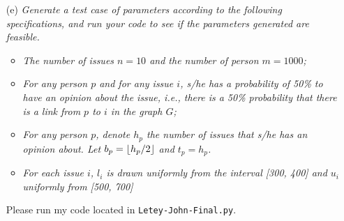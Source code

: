 \documentclass[12pt]{article}
\DeclarePairedDelimiter\floor{\lfloor}{\rfloor}
\begin{document}
{\begin{enumerate}
As Rhonda said, I called the built in NetworkX function.
\item[(e)]\textsl{Generate a test case of parameters according to the following specifications, and run your code to see if the parameters generated are feasible.}
\begin{itemize}
  \item \textsl{The number of issues $n = 10$ and the number of person $m = 1000$;}
  \item \textsl{For any person $p$ and for any issue $i$, s/he has a probability of 50\% to have an opinion about the issue, i.e., there is a 50\% probability that there is a link from $p$ to $i$ in the graph $G$;}
  \item \textsl{For any person $p$, denote $h_p$ the number of issues that s/he has an opinion about. Let $b_p = \floor{h_p/2}$ and $t_p = h_p$.}
  \item \textsl{For each issue $i$, $l_i$ is drawn uniformly from the interval [300, 400] and $u_i$ uniformly from [500, 700]}
\end{itemize}
Please run my code located in \texttt{Letey-John-Final.py}.
\end{enumerate}

\newpage
}
\end{document}
